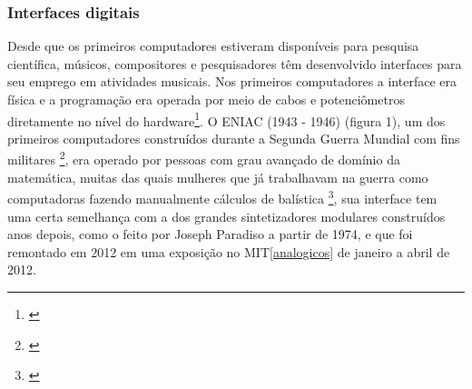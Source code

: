 






\subsubsection{Interfaces digitais}

Desde que os primeiros computadores estiveram disponíveis para pesquisa científica, músicos, compositores e pesquisadores têm desenvolvido interfaces para seu emprego em atividades musicais. Nos primeiros computadores a interface era física e a programação era operada por meio de cabos e potenciômetros diretamente no nível do hardware\footnote{\cite[110]{Henrique1996}}. O ENIAC (1943 - 1946) (figura 1), um dos primeiros computadores construídos durante a Segunda Guerra Mundial com fins militares \footnote{\cite[24]{Stolfi}}, era operado por pessoas com grau avançado de domínio da matemática, muitas das quais mulheres que já trabalhavam na guerra como computadoras fazendo manualmente cálculos de balística \footnote{\cite{HayleyWilliams2015}}, sua interface tem uma certa semelhança com a dos grandes sintetizadores modulares construídos anos depois, como o feito por Joseph Paradiso a partir de 1974, e que foi remontado em 2012 em uma exposição no MIT\ref{analogicos} de janeiro a abril de 2012. 

